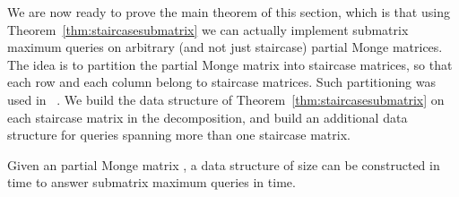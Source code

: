 \documentclass{llncs}
\begin{document}
We are now ready to prove the main theorem of this section, which is that using Theorem~\ref{thm:staircasesubmatrix} we can actually implement submatrix maximum queries on arbitrary (and not just staircase) partial Monge
matrices. The idea is to partition the partial Monge matrix into
staircase matrices, so that each row and each column belong to 
staircase matrices.  Such partitioning was used in~\cite{AggarwalK90,ourICALP} . We build the data structure of
Theorem~\ref{thm:staircasesubmatrix} on each staircase matrix in the
decomposition, and build an additional data structure for queries
spanning more than one staircase matrix. 



\begin{theorem}
\label{thm:partialsubmatrix}
Given an  partial Monge matrix , a data structure of size  can be constructed
in  time to answer submatrix maximum queries in  time.
\end{theorem}
\end{document}
